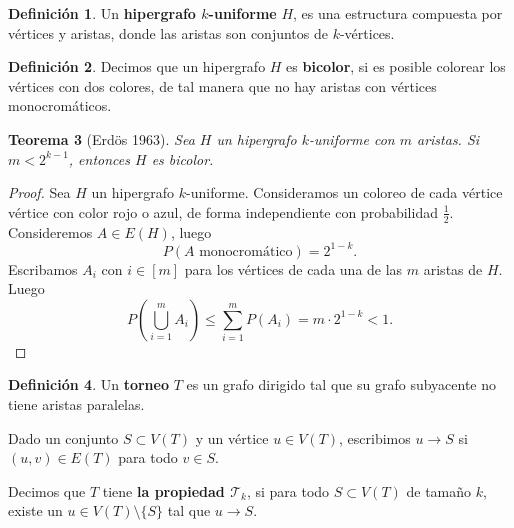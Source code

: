 \documentclass[12pt]{report}
\theoremstyle{plain}
\newtheorem{theorem}{Teorema}[section]
\theoremstyle{definition}
\newtheorem{definition}[theorem]{Definición}
\begin{document}
\begin{definition}
Un \textbf{hipergrafo $k$-uniforme} $H$, es una estructura compuesta por vértices y aristas, donde las aristas son conjuntos de $k$-vértices.
\end{definition}



\begin{definition}
Decimos que un hipergrafo $H$ es \textbf{bicolor}, si es posible colorear los vértices con dos colores, de tal manera que no hay aristas con vértices monocromáticos.
\end{definition}


\begin{theorem}[Erdös 1963]
Sea $H$ un hipergrafo $k$-uniforme con $m$ aristas. Si $m < 2^{k-1}$, entonces $H$ es bicolor.
\end{theorem}
\begin{proof}
Sea $H$ un hipergrafo $k$-uniforme. Consideramos un coloreo de cada vértice vértice con color rojo o azul, de forma independiente con probabilidad $\frac 1 2$.
Consideremos $A \in E(H)$, luego
\[
    P(A \text{ monocromático}) = 2^{1-k}.
\]
Escribamos $A_i$ con $i \in [m]$ para los vértices de cada una de las $m$ aristas de $H$. Luego
\[
    P(\bigcup_{i = 1}^m A_i) \leq \sum_{i = 1}^m P(A_i) = m \cdot 2^{1-k} < 1.
\]
\end{proof}


\begin{definition}
Un \textbf{torneo} $T$ es un grafo dirigido tal que su grafo subyacente no tiene aristas paralelas.

Dado un conjunto $S \subset V(T)$ y un vértice $u \in V(T)$, escribimos $u \to S$ si $(u,v) \in E(T)$ para todo $v \in S$.

Decimos que $T$ tiene \textbf{la propiedad $\mathcal T_k$}, si para todo $S \subset V(T)$ de tamaño $k$, existe un $u \in V(T) \setminus \{S\}$ tal que $u \to S$.
\end{definition}

\end{document}
